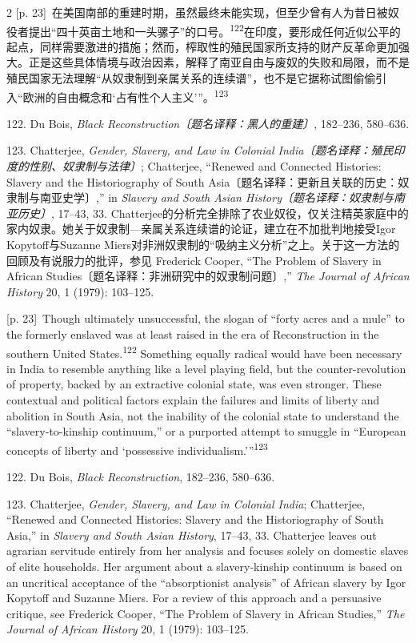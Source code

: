 \documentclass[10pt,a4paper]{article}
\begin{document}
\begin{paracol}{2}
{\scriptsize\color{gray} [p. 23]}\ 在美国南部的重建时期，虽然最终未能实现，但至少曾有人为昔日被奴役者提出“四十英亩土地和一头骡子”的口\mbox{号。\textsuperscript{122}}在印度，要形成任何近似公平的起点，同样需要激进的措施；然而，榨取性的殖民国家所支持的财产反革命更加强大。正是这些具体情境与政治因素，解释了南亚自由与废奴的失败和局限，而不是殖民国家无法理解“从奴隶制到亲属关系的连续谱”，也不是它据称试图偷偷引入“欧洲的自由概念和‘占有性个人主义’”。\nobreak\textsuperscript{123}\par{\small 122. Du Bois, \textit{Black Reconstruction〔题名译释：黑人的重建〕}, 182–236, 580–636.\par}{\small 123. Chatterjee, \textit{Gender, Slavery, and Law in Colonial India〔题名译释：殖民印度的性别、奴隶制与法律〕}; Chatterjee, “Renewed and Connected Histories: Slavery and the Historiography of South Asia〔题名译释：更新且关联的历史：奴隶制与南亚史学〕,” in \textit{Slavery and South Asian History〔题名译释：奴隶制与南亚历史〕}, 17–43, 33. Chatterjee的分析完全排除了农业奴役，仅关注精英家庭中的家内奴隶。她关于奴隶制—亲属关系连续谱的论证，建立在不加批判地接受Igor Kopytoff与Suzanne Miers对非洲奴隶制的“吸纳主义分析”之上。关于这一方法的回顾及有说服力的批评，参见 Frederick Cooper, “The Problem of Slavery in African Studies〔题名译释：非洲研究中的奴隶制问题〕,” \textit{The Journal of African History} 20, 1 (1979): 103–125.\par}
\switchcolumn
{\scriptsize\color{gray} [p. 23]}\ Though ultimately unsuccessful, the slogan of “forty acres and a mule” to the formerly enslaved was at least raised in the era of Reconstruction in the southern United States.\nobreak\textsuperscript{122} Something equally radical would have been necessary in India to resemble anything like a level playing field, but the counter-revolution of property, backed by an extractive colonial state, was even stronger. These contextual and political factors explain the failures and limits of liberty and abolition in South Asia, not the inability of the colonial state to understand the “slavery-to-kinship continuum,” or a purported attempt to smuggle in “European concepts of liberty and ‘possessive individualism.’”\nobreak\textsuperscript{123}\par{\small 122. Du Bois, \textit{Black Reconstruction}, 182–236, 580–636.\par}{\small 123. Chatterjee, \textit{Gender, Slavery, and Law in Colonial India}; Chatterjee, “Renewed and Connected Histories: Slavery and the Historiography of South Asia,” in \textit{Slavery and South Asian History}, 17–43, 33. Chatterjee leaves out agrarian servitude entirely from her analysis and focuses solely on domestic slaves of elite households. Her argument about a slavery-kinship continuum is based on an uncritical acceptance of the “absorptionist analysis” of African slavery by Igor Kopytoff and Suzanne Miers. For a review of this approach and a persuasive critique, see Frederick Cooper, “The Problem of Slavery in African Studies,” \textit{The Journal of African History} 20, 1 (1979): 103–125.\par}
\switchcolumn*
\end{paracol}
\end{document}
